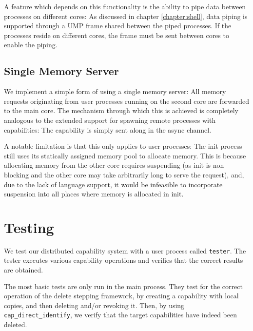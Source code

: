 A feature which depends on this functionality is the ability to pipe data between processes on different cores: As discussed in chapter \ref{chapter:shell}, data piping is supported through a UMP frame shared between the piped processes. If the processes reside on different cores, the frame must be sent between cores to enable the piping.

\subsection{Single Memory Server}
We implement a simple form of using a single memory server: All memory requests originating from user processes running on the second core are forwarded to the main core. The mechanism through which this is achieved is completely analogous to the extended support for spawning remote processes with capabilities: The capability is simply sent along in the async channel.

A notable limitation is that this only applies to user processes: The init process still uses its statically assigned memory pool to allocate memory. This is because allocating memory from the other core requires suspending (as init is non-blocking and the other core may take arbitrarily long to serve the request), and, due to the lack of language support, it would be infeasible to incorporate suspension into all places where memory is allocated in init.

\section{Testing}
We test our distributed capability system with a user process called \texttt{tester}. The tester executes various capability operations and verifies that the correct results are obtained.

The most basic tests are only run in the main process. They test for the correct operation of the delete stepping framework, by creating a capability with local copies, and then deleting and/or revoking it. Then, by using \texttt{cap\_direct\_identify}, we verify that the target capabilities have indeed been deleted.

